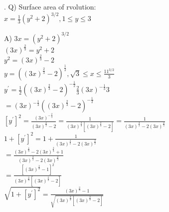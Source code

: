 \documentclass{article}
\newcounter{question}
\begin{document}
\newcommand\Que[1]{%
   \leavevmode\par
   \stepcounter{question}
   \noindent
   \thequestion. Q) #1\par}

\newcommand\Ans[2][]{%
    \leavevmode\par\noindent
   {A) \textbf{#1}#2\par}}

\Que{
    Surface area of rvolution:\\

    $ x = \frac{1}{3}(y^2+2)^{3/2}, 1 \le y \le 3 $\\
    }
\Ans{
    $ 3x = (y^2+2)^{3/2} $\\

    $ (3x)^{\frac{2}{3}} = y^2+2 $\\

    $ y^2 = (3x)^{\frac{2}{3}} - 2 $\\

    $ y = ((3x)^{\frac{2}{3}} - 2)^{\frac{1}{2}}
    , \sqrt{3} \le x \le \frac{11^{3/2}}{3} $\\

    $
    y^{\prime} = 
    \frac{1}{2}
    ((3x)^{\frac{2}{3}} - 2)^{-\frac{1}{2}}
    \frac{2}{3}(3x)^{-\frac{1}{3}}
    3
    $\\

    $
    = 
    (3x)^{-\frac{1}{3}}
    ((3x)^{\frac{2}{3}} - 2)^{-\frac{1}{2}}
    $\\

    $
    [y^{\prime}]^2 = 
    \frac{
        (3x)^{-\frac{2}{3}}
    }{
        (3x)^{\frac{2}{3}} - 2
    }
    =
    \frac{
        1
    }{
        (3x)^{\frac{2}{3}} [(3x)^{\frac{2}{3}} - 2]
    }
    =
    \frac{
        1
    }{
        (3x)^{\frac{4}{3}} - 2(3x)^{\frac{2}{3}}
    }
    $\\

    $
    1 + [y^{\prime}]^2 = 
    1 + \frac{
        1
    }{
        (3x)^{\frac{4}{3}} - 2(3x)^{\frac{2}{3}}
    }
    $\\

    $
    =
    \frac{
        (3x)^{\frac{4}{3}} - 2(3x)^{\frac{2}{3}} + 1
    }{
        (3x)^{\frac{4}{3}} - 2(3x)^{\frac{2}{3}}
    }
    $\\

    $
    =
    \frac{
        [(3x)^{\frac{2}{3}} - 1]^2
    }{
        (3x)^{\frac{2}{3}} [(3x)^{\frac{2}{3}} - 2]
    }
    $\\

    $
    \sqrt{1 + [y^{\prime}]^2} = 
    \frac{
        (3x)^{\frac{2}{3}} - 1
    }{
        \sqrt{(3x)^{\frac{2}{3}} [(3x)^{\frac{2}{3}} - 2]}
    }
    $\\

}
\end{document}
